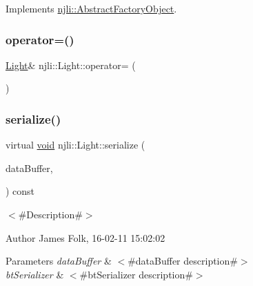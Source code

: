 Implements \mbox{\hyperlink{classnjli_1_1_abstract_factory_object_a838f4fa7e65cace6098aab5222892942}{njli\+::\+Abstract\+Factory\+Object}}.

\mbox{\label{classnjli_1_1_light_aea305e92709425c1617943175bd34542}} 
\subsubsection{\texorpdfstring{operator=()}{operator=()}}
{\footnotesize\ttfamily \mbox{\hyperlink{classnjli_1_1_light}{Light}}\& njli\+::\+Light\+::operator= (\begin{DoxyParamCaption}\item[{const \mbox{\hyperlink{classnjli_1_1_light}{Light}} \&}]{ }\end{DoxyParamCaption})\hspace{0.3cm}{\ttfamily [protected]}}

\mbox{\label{classnjli_1_1_light_a631788c53a51d9bd2d45aec1502197a7}} 
\subsubsection{\texorpdfstring{serialize()}{serialize()}}
{\footnotesize\ttfamily virtual \mbox{\hyperlink{_thread_8h_af1e856da2e658414cb2456cb6f7ebc66}{void}} njli\+::\+Light\+::serialize (\begin{DoxyParamCaption}\item[{\mbox{\hyperlink{_thread_8h_af1e856da2e658414cb2456cb6f7ebc66}{void}} $\ast$}]{data\+Buffer,  }\item[{bt\+Serializer $\ast$}]{ }\end{DoxyParamCaption}) const\hspace{0.3cm}{\ttfamily [virtual]}}



$<$\#\+Description\#$>$ 

\begin{DoxyAuthor}{Author}
James Folk, 16-\/02-\/11 15\+:02\+:02
\end{DoxyAuthor}

\begin{DoxyParams}{Parameters}
{\em data\+Buffer} & $<$\#data\+Buffer description\#$>$ \\
\hline
{\em bt\+Serializer} & $<$\#bt\+Serializer description\#$>$ \\
\hline
\end{DoxyParams}


